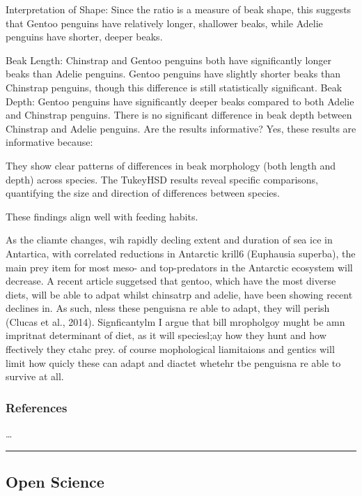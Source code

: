 \documentclass[
]{article}
\begin{document}
Interpretation of Shape: Since the ratio is a measure of beak shape,
this suggests that Gentoo penguins have relatively longer, shallower
beaks, while Adelie penguins have shorter, deeper beaks.

Beak Length: Chinstrap and Gentoo penguins both have significantly
longer beaks than Adelie penguins. Gentoo penguins have slightly shorter
beaks than Chinstrap penguins, though this difference is still
statistically significant. Beak Depth: Gentoo penguins have
significantly deeper beaks compared to both Adelie and Chinstrap
penguins. There is no significant difference in beak depth between
Chinstrap and Adelie penguins. Are the results informative? Yes, these
results are informative because:

They show clear patterns of differences in beak morphology (both length
and depth) across species. The TukeyHSD results reveal specific
comparisons, quantifying the size and direction of differences between
species.

These findings align well with feeding habits.

As the cliamte changes, wih rapidly decling extent and duration of sea
ice in Antartica, with correlated reductions in Antarctic krill6
(Euphausia superba), the main prey item for most meso- and top-predators
in the Antarctic ecosystem will decrease. A recent article suggetsed
that gentoo, which have the most diverse diets, will be able to adpat
whilst chinsatrp and adelie, have been showing recent declines in. As
such, nless these penguisna re able to adapt, they will perish (Clucas
et al., 2014). Signficantylm I argue that bill mropholgoy mught be amn
impritnat determinant of diet, as it will speciesl;ay how they hunt and
how ffectively they ctahc prey. of course mophological liamitaions and
gentics will limit how quicly these can adapt and diactet whetehr tbe
penguisna re able to survive at all.

\subsubsection{References}\label{references}

\ldots{}

\begin{center}\rule{0.5\linewidth}{0.5pt}\end{center}

\subsection{Open Science}\label{open-science}
\end{document}
